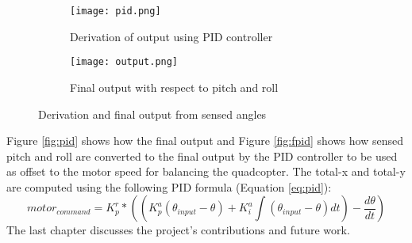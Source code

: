 \begin{figure}[H]
  \begin{subfigure}{1\textwidth}
    \centering
    \texttt{[image: pid.png]}
    \caption{Derivation of output using PID controller\label{fig:pid}}
    \label{Motor output}  
  \end{subfigure}
  \begin{subfigure}{1\textwidth}
    \centering
    \texttt{[image: output.png]}
    \caption{Final output with respect to pitch and roll\label{fig:fpid}}
    \label{Measurement of pitch and roll} 
  \end{subfigure}
  \caption{Derivation and final output from sensed angles}
\end{figure}
\noindent
Figure \ref{fig:pid} shows how the final output and Figure \ref{fig:fpid} shows how sensed pitch and roll are converted to the final output by the PID controller to be used as offset to the motor speed for balancing the quadcopter. The total-x and total-y are computed using the following PID formula (Equation \ref{eq:pid}):
\begin{equation}
motor_{command} = K_p^r*((K_p^a(\theta_{input} - \theta) + K_i^a\int (\theta_{input} - \theta)dt) -\frac{d\theta}{dt})
\label{eq:pid} 
\end{equation}
\newline
\newline
The last chapter discusses the project's contributions and future work.
